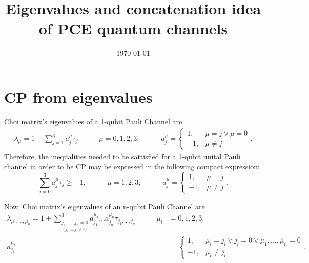 \documentclass[11pt,dvipsnames]{article} %
\newcommand{\1}{\mathds{1}}
\begin{document}
\title{Eigenvalues and concatenation idea of PCE quantum channels} 
\date{\today}  
\maketitle
\section*{CP from eigenvalues} %
Choi matrix's eigenvalues of a 1-qubit Pauli Channel are
\begin{align}
\lambda_{\mu}=1+\sum_{j=1}^3a_j^{\mu}\tau_j
\hspace{35pt}
\mu=0,1,2,3;
\hspace{35pt}
a_j^{\mu}=\left\{ \begin{array}{rl}
             1, & \mu=j \lor \mu=0\\
             -1, & \mu\neq j
             \end{array}
   \right..
\end{align}
Therefore, the inequalities needed to be sattisfied for a 1-qubit 
unital Pauli channel in order to be CP may be expressed in the 
following compact expression:
\begin{equation}
\sum_{j=0}^3a_j^{\mu}\tau_j\geq -1,
\hspace{35pt}
\mu=1,2,3;
\hspace{35pt}
a_j^{\mu}=\left\{ \begin{array}{rl}
             1, & \mu=j\\
             -1, & \mu\neq j
             \end{array}
   \right..
\end{equation}

Now, Choi matrix's eigenvalues of an n-qubit Pauli Channel are
\begin{align}
\lambda_{\mu_1,\ldots,\mu_n}=1+
\sum_{\underset{(j_1,\ldots,j_n\neq0)}{j_1,\ldots,j_n=0}}^3
a_{j_1}^{\mu_1}\ldots a_{j_n}^{\mu_n}\tau_{j_1,\ldots,j_n}
\hspace{35pt}
\mu_l&=0,1,2,3,\nonumber\\
a_{j_l}^{\mu_l}&=\left\{ \begin{array}{rl}
             1, & \mu_l=j_l \lor j_l=0\lor \mu_1,\ldots,\mu_n=0\\
             -1, & \mu_l\neq j_l
             \end{array}
   \right..
\end{align}
\end{document}
